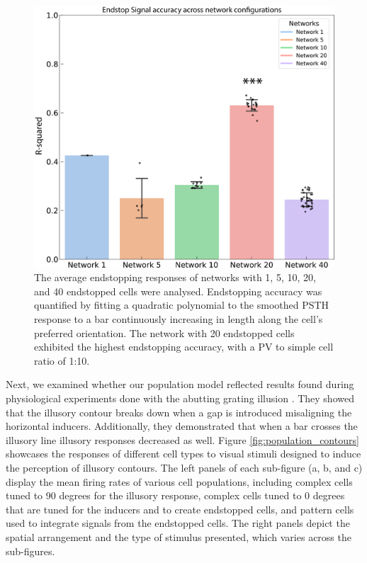 \documentclass[12pt]{article}
\begin{document}
\begin{figure}[H]
  \centering
  \includegraphics[width=1.0 \textwidth]{adjusted_figures/figure_networks_bar.png}
  \caption{The average endstopping responses of networks with 1, 5, 10, 20, and 40 endstopped cells were analysed. Endstopping accuracy was quantified by fitting a quadratic polynomial to the smoothed PSTH response to a bar continuously increasing in length along the cell's preferred orientation. The network with 20 endstopped cells exhibited the highest endstopping accuracy, with a PV to simple cell ratio of 1:10.}
  \label{fig:endstop_network}
\end{figure}
Next, we examined whether our population model reflected results found during physiological experiments done with the abutting grating illusion \autocite{vonderheydtMechanismsContourPerception1989}. They showed that the illusory contour breaks down when a gap is introduced misaligning the horizontal inducers. Additionally, they demonstrated that when a bar crosses the illusory line illusory responses decreased as well. Figure \ref{fig:population_contours} showcases the responses of different cell types to visual stimuli designed to induce the perception of illusory contours. The left panels of each sub-figure (a, b, and c) display the mean firing rates of various cell populations, including complex cells tuned to 90 degrees for the illusory response, complex cells tuned to 0 degrees that are tuned for the inducers and to create endstopped cells, and pattern cells used to integrate signals from the endstopped cells. The right panels depict the spatial arrangement and the type of stimulus presented, which varies across the sub-figures.
\end{document}

